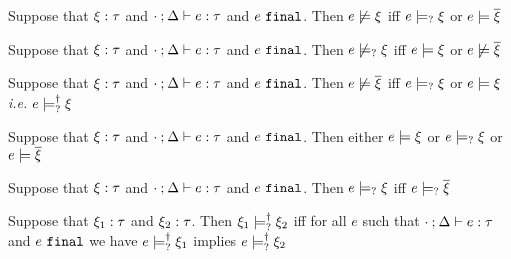 \begin{lem}
  \label{lem:neg-satisfy}
  Suppose that $\xi : \tau$ and $\cdot \mathbin{;} \Delta \vdash e : \tau$ and $e ~\mathtt{final}$. Then $e \not\models \xi$ iff $e \models_{?} \xi$ or $e \models \overline{\xi}$
\end{lem}
\begin{lem}
  \label{lem:neg-possible-satisfy}
  Suppose that $\xi : \tau$ and $\cdot \mathbin{;} \Delta \vdash e : \tau$ and $e ~\mathtt{final}$. Then $e \not\models_{?} \xi$ iff $e \models \xi$ or $e \not\models \overline{\xi}$
\end{lem}
\begin{lem}
  \label{lem:neg-dual-satisfy}
  Suppose that $\xi : \tau$ and $\cdot \mathbin{;} \Delta \vdash e : \tau$ and $e ~\mathtt{final}$. Then $e \not\models \overline{\xi}$ iff $e \models_{?} \xi$ or $e \models \xi$ \textit{i.e.} $e \models_{?}^{\dag} \xi$
\end{lem}
\begin{lem}
  \label{lem:coverage-constraint-satisfy}
  Suppose that $\xi : \tau$ and $\cdot \mathbin{;} \Delta \vdash e : \tau$ and $e ~\mathtt{final}$. Then either $e \models \xi$ or $e \models_{?} \xi$ or $e \models \overline{\xi}$
\end{lem}

\begin{corol}
  \label{corol:possible-satisfy-dual}
  Suppose that $\xi : \tau$ and $\cdot \mathbin{;} \Delta \vdash e : \tau$ and $e ~\mathtt{final}$. Then $e \models_{?} \xi$ iff $e \models_{?} \overline{\xi}$
\end{corol}

\begin{defn}
  \label{defn:nn-entailment}
  Suppose that $\xi_1 : \tau$ and $\xi_2 : \tau$. Then $\xi_1 \models_{?}^{\dag} \xi_2$ iff for all $e$ such that $\cdot \mathbin{;} \Delta \vdash e : \tau$ and $e ~\mathtt{final}$ we have $e \models_{?}^{\dag} \xi_1$ implies $e \models_{?}^{\dag} \xi_2$ 
\end{defn}

